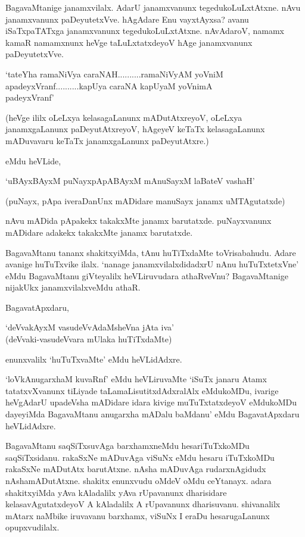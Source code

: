 BagavaMtanige janamxvilalx. AdarU janamxvanunx tegedukoLuLxtAtxne. nAvu janamxvanunx paDeyutetxVve. hAgAdare Enu vayxtAyxsa? avanu iSaTxpaTATxga janamxvanunx tegedukoLuLxtAtxne. nAvAdaroV, namamx kamaR namamxnunx heVge taLuLxtatxdeyoV hAge janamxvanunx paDeyutetxVve.

\begin{shloka}
`tateYha ramaNiVya caraNAH..........ramaNiVyAM yoVniM\\
apadeyxVranf..........kapUya caraNA kapUyaM yoVnimA\\
padeyxVranf'
\end{shloka}

(heVge ililx oLeLxya kelasagaLanunx mADutAtxreyoV, oLeLxya janamxgaLanunx paDeyutAtxreyoV, hAgeyeV keTaTx kelasagaLanunx mADuvavaru keTaTx janamxgaLanunx paDeyutAtxre.)

eMdu heVLide,

\begin{shloka}
`uBAyxBAyxM puNayxpApABAyxM mAnuSayxM laBateV vashaH'
\end{shloka}

(puNayx, pApa iveraDanUnx mADidare manuSayx janamx uMTAgutatxde)

nAvu mADida pApakekx takakxMte janamx barutatxde. puNayxvanunx mADidare adakekx takakxMte janamx barutatxde.

BagavaMtanu tananx shakitxyiMda, tAnu huTiTxdaMte toVrisabahudu. Adare avanige huTuTxvike ilalx. `nanage janamxvilalxdidadxrU nAnu huTuTxtetxVne' eMdu BagavaMtanu giVteyalilx heVLiruvudara athaRveVnu? BagavaMtanige nijakUkx janamxvilalxveMdu athaR.

BagavatApxdaru,

\begin{shloka}
`deVvakAyxM vasudeVvAdaMsheVna jAta iva'\\
(deVvaki-vasudeVvara mUlaka huTiTxdaMte)
\end{shloka}

enunxvalilx `huTuTxvaMte' eMdu heVLidAdxre.

`loVkAnugarxhaM kuvaRnf' eMdu heVLiruvaMte `iSuTx janaru Atamx tatatxvXvanunx tiLiyade taLamaLisutitxdAdxralAlx eMdukoMDu, ivarige heVgAdarU upadeVsha mADidare idara kivige muTuTxtatxdeyoV eMdukoMDu dayeyiMda BagavaMtanu anugarxha mADalu baMdanu' eMdu BagavatApxdaru heVLidAdxre.


BagavaMtanu saqSiTxsuvAga barxhamxneMdu hesariTuTxkoMDu saqSiTxsidanu. rakaSxNe mADuvAga viSuNx eMdu hesaru iTuTxkoMDu rakaSxNe mADutAtx barutAtxne. nAsha mADuvAga rudarxnAgidudx nAshamADutAtxne. shakitx enunxvudu oMdeV oMdu ceYtanayx. adara shakitxyiMda yAva kAladalilx yAva rUpavanunx dharisidare kelasavAgutatxdeyoV A kAladalilx A rUpavanunx dharisuvanu. shivanalilx mAtarx naMbike iruvavanu barxhamx, viSuNx I eraDu hesarugaLanunx opupxvudilalx.


